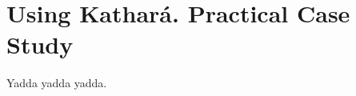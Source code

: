 \section{Using Kathará. Practical Case Study}
\label{sec:corepracticalcasestudy}

Yadda yadda yadda.


